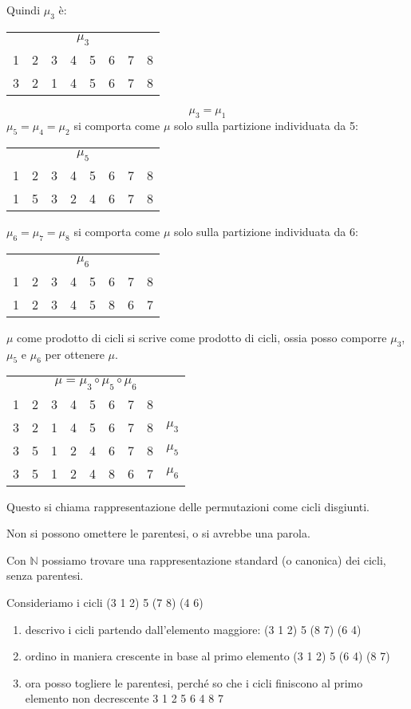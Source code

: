 Quindi $\mu_3$ \`e:

\begin{tabular}{*{8}{c}}
\multicolumn{8}{c}{$\mu_3$} \\
1 & 2 & 3 & 4 & 5 & 6 & 7 & 8 \\
3 & 2 & 1 & 4 & 5 & 6 & 7 & 8
\end{tabular}
\[
\mu_3 = \mu_1
\]
$\mu_5 = \mu_4 = \mu_2$ si comporta come $\mu$ solo sulla partizione individuata da 5:

\begin{tabular}{*{8}{c}}
\multicolumn{8}{c}{$\mu_5$} \\
1 & 2 & 3 & 4 & 5 & 6 & 7 & 8 \\
1 & 5 & 3 & 2 & 4 & 6 & 7 & 8
\end{tabular}

$\mu_6 = \mu_7 = \mu_8$ si comporta come $\mu$ solo sulla partizione individuata da 6:

\begin{tabular}{*{8}{c}}
\multicolumn{8}{c}{$\mu_6$} \\
1 & 2 & 3 & 4 & 5 & 6 & 7 & 8 \\
1 & 2 & 3 & 4 & 5 & 8 & 6 & 7
\end{tabular}

$\mu$ come prodotto di cicli si scrive come prodotto di cicli, ossia posso comporre $\mu_3$, $\mu_5$ e $\mu_6$ per ottenere $\mu$.

\begin{tabular}{*{9}{c}}
\multicolumn{9}{c}{$\mu = \mu_3 \circ \mu_5 \circ \mu_6$} \\
1 & 2 & 3 & 4 & 5 & 6 & 7 & 8 & \\
3 & 2 & 1 & 4 & 5 & 6 & 7 & 8 & $\mu_3$ \\
3 & 5 & 1 & 2 & 4 & 6 & 7 & 8 & $\mu_5$ \\
3 & 5 & 1 & 2 & 4 & 8 & 6 & 7 & $\mu_6$
\end{tabular}

Questo si chiama rappresentazione delle permutazioni come cicli disgiunti.

Non si possono omettere le parentesi, o si avrebbe una parola.

Con $\mathbb{N}$ possiamo trovare una rappresentazione standard (o canonica) dei cicli, senza parentesi.

Consideriamo i cicli (3 1 2) 5 (7 8) (4 6)

\begin{enumerate}
    \item descrivo i cicli partendo dall'elemento maggiore:
    (3 1 2) 5 (8 7) (6 4)
    \item ordino in maniera crescente in base al primo elemento
    (3 1 2) 5 (6 4) (8 7)
    \item ora posso togliere le parentesi, perch\'e so che i cicli finiscono al primo elemento non decrescente
    3 1 2 5 6 4 8 7
\end{enumerate}

